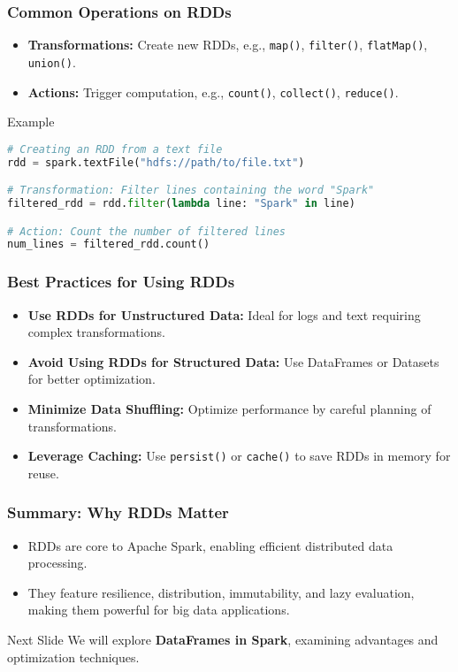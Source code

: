 \documentclass[aspectratio=169]{beamer}
\begin{document}
\begin{frame}[fragile]
    \frametitle{Common Operations on RDDs}
    \begin{itemize}
        \item \textbf{Transformations:} Create new RDDs, e.g., \texttt{map()}, \texttt{filter()}, \texttt{flatMap()}, \texttt{union()}.
        \item \textbf{Actions:} Trigger computation, e.g., \texttt{count()}, \texttt{collect()}, \texttt{reduce()}.
    \end{itemize}
    \begin{block}{Example}
     \begin{lstlisting}[language=Python]
# Creating an RDD from a text file
rdd = spark.textFile("hdfs://path/to/file.txt")

# Transformation: Filter lines containing the word "Spark"
filtered_rdd = rdd.filter(lambda line: "Spark" in line)

# Action: Count the number of filtered lines
num_lines = filtered_rdd.count()
     \end{lstlisting}
    \end{block}
\end{frame}

\begin{frame}[fragile]
    \frametitle{Best Practices for Using RDDs}
    \begin{itemize}
        \item \textbf{Use RDDs for Unstructured Data:} Ideal for logs and text requiring complex transformations.
        \item \textbf{Avoid Using RDDs for Structured Data:} Use DataFrames or Datasets for better optimization.
        \item \textbf{Minimize Data Shuffling:} Optimize performance by careful planning of transformations.
        \item \textbf{Leverage Caching:} Use \texttt{persist()} or \texttt{cache()} to save RDDs in memory for reuse.
    \end{itemize}
\end{frame}

\begin{frame}[fragile]
    \frametitle{Summary: Why RDDs Matter}
    \begin{itemize}
        \item RDDs are core to Apache Spark, enabling efficient distributed data processing.
        \item They feature resilience, distribution, immutability, and lazy evaluation, making them powerful for big data applications.
    \end{itemize}
    \begin{block}{Next Slide}
        We will explore \textbf{DataFrames in Spark}, examining advantages and optimization techniques.
    \end{block}
\end{frame}
\end{document}
